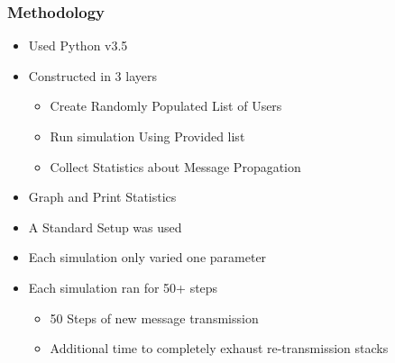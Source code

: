 \begin{frame}
    \frametitle{Methodology}
    \begin{itemize}
        \item Used Python v3.5
        \item Constructed in 3 layers
        \begin{itemize}
            \item Create Randomly Populated List of Users
            \item Run simulation Using Provided list
            \item Collect Statistics about Message Propagation
        \end{itemize}
        \item Graph and Print Statistics\\[0.5cm]
    \end{itemize}
    
    \begin{itemize}
        \item A Standard Setup was used
        \item Each simulation only varied one parameter
        \item Each simulation ran for 50+ steps
        \begin{itemize}
            \item 50 Steps of new message transmission
            \item Additional time to completely exhaust re-transmission stacks
        \end{itemize}
    \end{itemize}
\end{frame}

